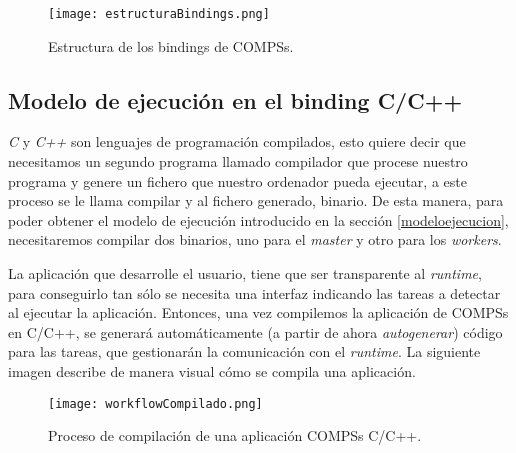 \begin{figure}[H]
    \centering 
    \caption{Estructura de los bindings de COMPSs.}
    \texttt{[image: estructuraBindings.png]}
    \label{fig:estructurabindings}
\end{figure}

\subsection{Modelo de ejecución en el binding C/C++}
\label{sec:bindings}

\textit{C} y \textit{C++} son lenguajes de programación compilados, esto quiere decir que necesitamos un segundo programa llamado compilador que procese nuestro programa y genere un fichero que nuestro ordenador pueda ejecutar, a este proceso se le llama compilar y al fichero generado, binario. De esta manera, para poder obtener el modelo de ejecución introducido en la sección \ref{modeloejecucion}, necesitaremos compilar dos binarios, uno para el \textit{master} y otro para los \textit{workers}.
\par\bigskip

\begin{comment}
La aplicación que desarrolla el usuario, \textit{a priori} no envía las tareas a ejecutar ni las dependencias entre estas, no gestiona el \textit{runtime}, pero es desarrollada siguiendo unas directrices que nos permitirán generar código que sí gestione todo lo que es necesario con tal de que la aplicación se distribuya correctamente. 
\end{comment}

La aplicación que desarrolle el usuario, tiene que ser transparente al \textit{runtime}, para conseguirlo tan sólo se necesita una interfaz indicando las tareas a detectar al ejecutar la aplicación. Entonces, una vez compilemos la aplicación de COMPSs en C/C++, se generará automáticamente (a partir de ahora \textit{autogenerar}) código para las tareas, que gestionarán la comunicación con el \textit{runtime}.
\smallskip
La siguiente imagen describe de manera visual cómo se compila una aplicación. 

\begin{figure}[H]
    \centering 
    \caption{Proceso de compilación de una aplicación COMPSs C/C++.}
    \texttt{[image: workflowCompilado.png]}
    \label{fig:workflowcompilado}
\end{figure}


